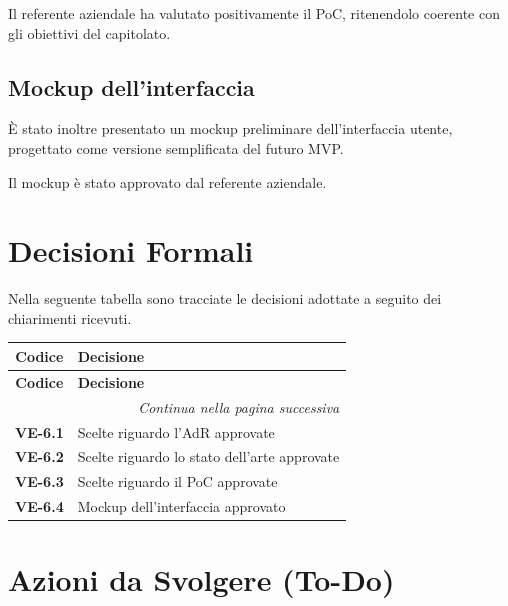 Il referente aziendale ha valutato positivamente il PoC,
ritenendolo coerente con gli obiettivi del capitolato.

\subsection{Mockup dell’interfaccia}

È stato inoltre presentato un mockup preliminare dell’interfaccia
utente, progettato come versione semplificata del futuro MVP.

Il mockup è stato approvato dal referente aziendale.

\newpage
\section{Decisioni Formali}
Nella seguente tabella sono tracciate le decisioni adottate a seguito
dei chiarimenti ricevuti.

\renewcommand{\arraystretch}{1.3}
\vspace{-0.3cm}
\noindent
\begin{longtable}{c p{12cm}}
	\toprule
	\textbf{Codice} & \textbf{Decisione} \\
	\midrule
	\endfirsthead

	\toprule
	\textbf{Codice} & \textbf{Decisione} \\
	\midrule
	\endhead

	\midrule
	\multicolumn{2}{r}{\textit{Continua nella pagina successiva}} \\
	\midrule
	\endfoot

	\bottomrule
	\endlastfoot

	\textbf{VE-6.1}
		& Scelte riguardo l'AdR approvate \\[4pt]

	\textbf{VE-6.2}
		& Scelte riguardo lo stato dell'arte approvate \\[4pt]

	\textbf{VE-6.3}
		& Scelte riguardo il PoC approvate \\[4pt]

	\textbf{VE-6.4}
		& Mockup dell'interfaccia approvato \\[4pt]
\end{longtable}

\newpage
\section{Azioni da Svolgere (To-Do)}

